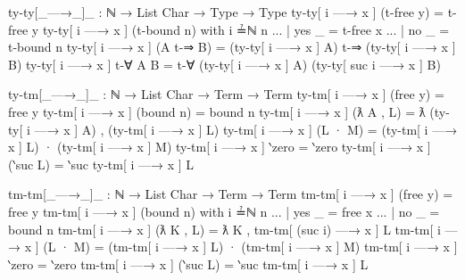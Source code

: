 \documentclass[logo,bsc,singlespacing,parskip,online]{infthesis}
\renewenvironment{code}{\mintedcopy[breaklines,breaksymbolleft=\;]{agda}}{\endmintedcopy}
\begin{document}
\begin{code}
  ty-ty[_—→_]_ : ℕ → List Char → Type → Type
  ty-ty[ i —→ x ] (t-free y) = t-free y
  ty-ty[ i —→ x ] (t-bound n) with i ≟ℕ n
  ... | yes _ = t-free x
  ... | no  _ = t-bound n
  ty-ty[ i —→ x ] (A t-⇒ B) = (ty-ty[ i —→ x ] A) t-⇒ (ty-ty[ i —→ x ] B)
  ty-ty[ i —→ x ] t-∀ A B = t-∀ (ty-ty[ i —→ x ] A) (ty-ty[ suc i —→ x ] B)

  ty-tm[_—→_]_ : ℕ → List Char → Term → Term
  ty-tm[ i —→ x ] (free y) = free y
  ty-tm[ i —→ x ] (bound n) = bound n
  ty-tm[ i —→ x ] (ƛ A , L) = ƛ (ty-ty[ i —→ x ] A) , (ty-tm[ i —→ x ] L)
  ty-tm[ i —→ x ] (L · M) = (ty-tm[ i —→ x ] L) · (ty-tm[ i —→ x ] M)
  ty-tm[ i —→ x ] ‵zero = ‵zero
  ty-tm[ i —→ x ] (‵suc L) = ‵suc ty-tm[ i —→ x ] L

  tm-tm[_—→_]_ : ℕ → List Char → Term → Term
  tm-tm[ i —→ x ] (free y) = free y
  tm-tm[ i —→ x ] (bound n) with i ≟ℕ n
  ... | yes _ = free x
  ... | no  _ = bound n
  tm-tm[ i —→ x ] (ƛ K , L) = ƛ K , tm-tm[ (suc i) —→ x ] L
  tm-tm[ i —→ x ] (L · M) = (tm-tm[ i —→ x ] L) · (tm-tm[ i —→ x ] M)
  tm-tm[ i —→ x ] ‵zero = ‵zero
  tm-tm[ i —→ x ] (‵suc L) = ‵suc tm-tm[ i —→ x ] L
\end{code}

\begin{comment}
However, I may use a different approach at some point and need to use closing. Just in case, I'll
define it here.
\begin{code}
  ty-ty[_←—_]_ : ℕ → List Char → Type → Type
  ty-ty[ i ←— x ] (t-free y) with x ≟lchar y
  ... | yes _ = t-bound i
  ... | no  _ = t-free y
  ty-ty[ i ←— x ] (t-bound n) = t-bound n
  ty-ty[ i ←— x ] (A t-⇒ B) = (ty-ty[ i ←— x ] A) t-⇒ (ty-ty[ i ←— x ] B)
  ty-ty[ i ←— x ] t-∀ A B = t-∀ (ty-ty[ i ←— x ] A) (ty-ty[ suc i ←— x ] B)

  ty-tm[_←—_]_ : ℕ → List Char → Term → Term
  ty-tm[ i ←— x ] (free y) = free y
  ty-tm[ i ←— x ] (bound n) = bound n
  ty-tm[ i ←— x ] (ƛ A , L) = ƛ (ty-ty[ i ←— x ] A) , (ty-tm[ i ←— x ] L)
  ty-tm[ i ←— x ] (L · M) = (ty-tm[ i ←— x ] L) · (ty-tm[ i ←— x ] M)
  ty-tm[ i ←— x ] ‵zero = ‵zero
  ty-tm[ i ←— x ] (‵suc L) = ‵suc ty-tm[ i ←— x ] L

  tm-tm[_←—_]_ : ℕ → List Char → Term → Term
  tm-tm[ i ←— x ] (free y) with x ≟lchar y
  ... | yes _ = bound i
  ... | no  _ = free y
  tm-tm[ i ←— x ] (bound n) = bound n
  tm-tm[ i ←— x ] (ƛ A , L) = ƛ A , tm-tm[ (suc i) ←— x ] L
  tm-tm[ i ←— x ] (L · M) = (tm-tm[ i ←— x ] L) · (tm-tm[ i ←— x ] M)
  tm-tm[ i ←— x ] ‵zero = ‵zero
  tm-tm[ i ←— x ] (‵suc L) = ‵suc tm-tm[ i ←— x ] L
\end{code}
\end{comment}
\end{document}
